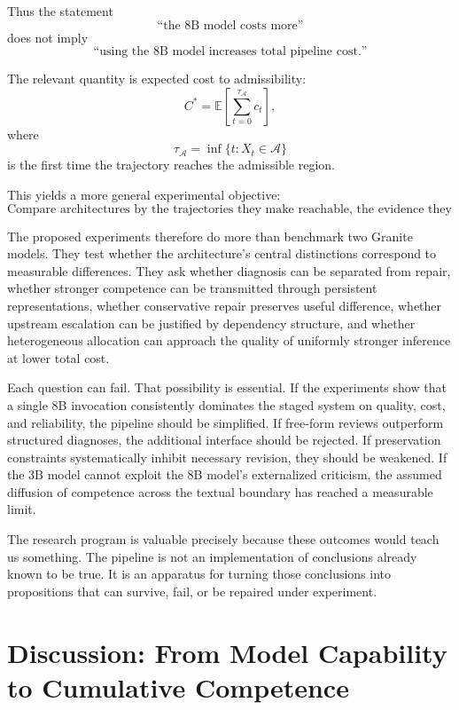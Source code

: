 \documentclass[11pt]{article}
\begin{document}
Thus the statement
\[
    \text{``the 8B model costs more''}
\]
does not imply
\[
    \text{``using the 8B model increases total pipeline cost.''}
\]

The relevant quantity is expected cost to admissibility:
\[
    C^\ast
    =
    \mathbb{E}
    \left[
        \sum_{t=0}^{\tau_{\mathcal A}}
        c_t
    \right],
\]
where
\[
    \tau_{\mathcal A}
    =
    \inf
    \{
        t:
        X_t\in\mathcal A
    \}
\]
is the first time the trajectory reaches the admissible region.

This yields a more general experimental objective:
\[
    \boxed{
    \text{Compare architectures by the trajectories they make reachable,
    the evidence they preserve, and the cost required to reach an
    admissible result.}
    }
\]

The proposed experiments therefore do more than benchmark two Granite models. They test whether the architecture's central distinctions correspond to measurable differences. They ask whether diagnosis can be separated from repair, whether stronger competence can be transmitted through persistent representations, whether conservative repair preserves useful difference, whether upstream escalation can be justified by dependency structure, and whether heterogeneous allocation can approach the quality of uniformly stronger inference at lower total cost.

Each question can fail. That possibility is essential. If the experiments show that a single 8B invocation consistently dominates the staged system on quality, cost, and reliability, the pipeline should be simplified. If free-form reviews outperform structured diagnoses, the additional interface should be rejected. If preservation constraints systematically inhibit necessary revision, they should be weakened. If the 3B model cannot exploit the 8B model's externalized criticism, the assumed diffusion of competence across the textual boundary has reached a measurable limit.

The research program is valuable precisely because these outcomes would teach us something. The pipeline is not an implementation of conclusions already known to be true. It is an apparatus for turning those conclusions into propositions that can survive, fail, or be repaired under experiment.

\section{Discussion: From Model Capability to Cumulative Competence}
\end{document}
